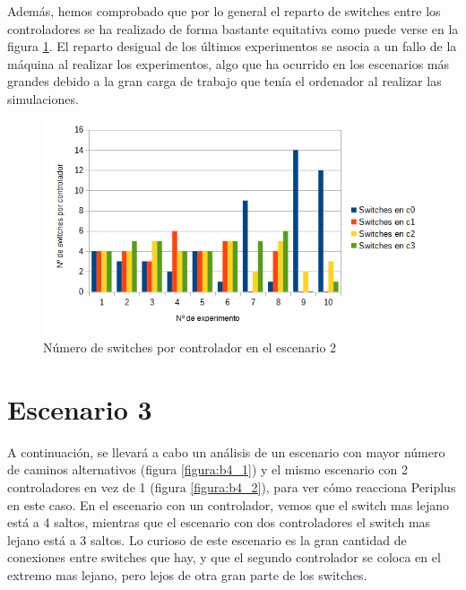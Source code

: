 \documentclass[a4paper, 12pt]{book}
\begin{document}
 	\vspace{10pt} 
 	
 	Además, hemos comprobado que por lo general el reparto de switches entre los controladores se ha realizado de forma bastante equitativa como puede verse en la figura \ref{figura:switchesporcontrollermesh}. El reparto desigual de los últimos experimentos se asocia a un fallo de la máquina al realizar los experimentos, algo que ha ocurrido en los escenarios más grandes debido a la gran carga de trabajo que tenía el ordenador al realizar las simulaciones. 
 	
 	
 	\begin{figure}[H]
 		\centering
 		\includegraphics[width=16cm, keepaspectratio]{img/switchesporcontrollermesh}
 		\caption{Número de switches por controlador en el escenario 2}
 		\label{figura:switchesporcontrollermesh}
 	\end{figure}
 	
 	
 	\clearpage
 	\section{Escenario 3}
 	 
 	A continuación, se llevará a cabo un análisis de un escenario con mayor número de caminos alternativos (figura \ref{figura:b4_1}) y el mismo escenario con 2 controladores en vez de 1 (figura \ref{figura:b4_2}), para ver cómo reacciona Periplus en este caso.
 	En el escenario con un controlador, vemos que el switch mas lejano está a 4 saltos, mientras que el escenario con dos controladores el switch mas lejano está a 3 saltos. Lo curioso de este escenario es la gran cantidad de conexiones entre switches que hay, y que el segundo controlador se coloca en el extremo mas lejano, pero lejos de otra gran parte de los switches.
 	
\end{document}
